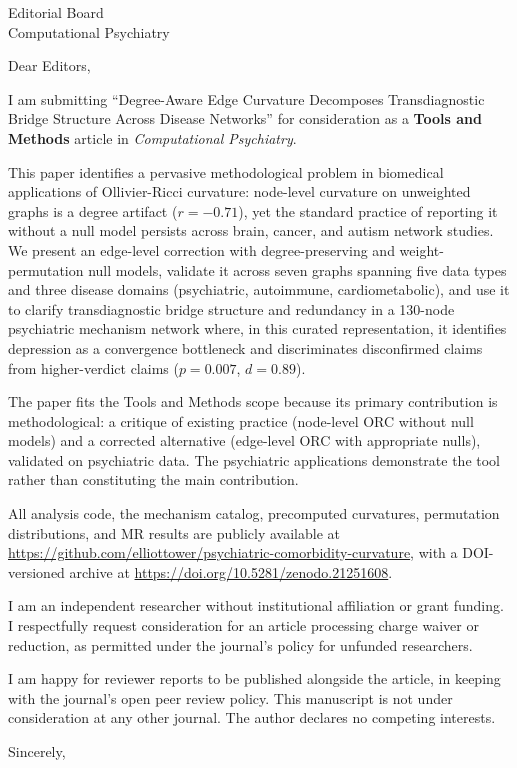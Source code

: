 \documentclass[11pt]{letter}
\begin{document}
\begin{letter}{Editorial Board\\Computational Psychiatry}

\opening{Dear Editors,}

I am submitting ``Degree-Aware Edge Curvature Decomposes Transdiagnostic Bridge Structure Across Disease Networks'' for consideration as a \textbf{Tools and Methods} article in \emph{Computational Psychiatry}.

This paper identifies a pervasive methodological problem in biomedical applications of Ollivier-Ricci curvature: node-level curvature on unweighted graphs is a degree artifact ($r = -0.71$), yet the standard practice of reporting it without a null model persists across brain, cancer, and autism network studies. We present an edge-level correction with degree-preserving and weight-permutation null models, validate it across seven graphs spanning five data types and three disease domains (psychiatric, autoimmune, cardiometabolic), and use it to clarify transdiagnostic bridge structure and redundancy in a 130-node psychiatric mechanism network where, in this curated representation, it identifies depression as a convergence bottleneck and discriminates disconfirmed claims from higher-verdict claims ($p = 0.007$, $d = 0.89$).

The paper fits the Tools and Methods scope because its primary contribution is methodological: a critique of existing practice (node-level ORC without null models) and a corrected alternative (edge-level ORC with appropriate nulls), validated on psychiatric data. The psychiatric applications demonstrate the tool rather than constituting the main contribution.

All analysis code, the mechanism catalog, precomputed curvatures, permutation distributions, and MR results are publicly available at \url{https://github.com/elliottower/psychiatric-comorbidity-curvature}, with a DOI-versioned archive at \url{https://doi.org/10.5281/zenodo.21251608}.

I am an independent researcher without institutional affiliation or grant funding. I respectfully request consideration for an article processing charge waiver or reduction, as permitted under the journal's policy for unfunded researchers.

I am happy for reviewer reports to be published alongside the article, in keeping with the journal's open peer review policy. This manuscript is not under consideration at any other journal. The author declares no competing interests.

\closing{Sincerely,}

\end{letter}
\end{document}
